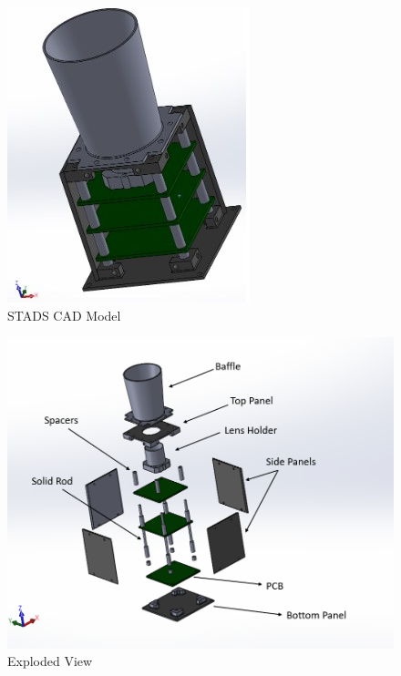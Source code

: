\documentclass[../../main.tex]{subfiles}
\begin{document}
\begin{enumerate}
    \begin{figure}[H]
        \centering
        \includegraphics{Figures/Mechanical/stads_full.jpg}
        \caption{STADS CAD Model}
        \label{fig:sys_CAD}
    \end{figure}
    \begin{figure}[H]
        \centering
        \includegraphics[scale=0.5]{Figures/Mechanical/exploded.png}
        \caption{Exploded View}
        \label{fig:sys_CAD}
    \end{figure}
    \end{enumerate}
\end{document}

